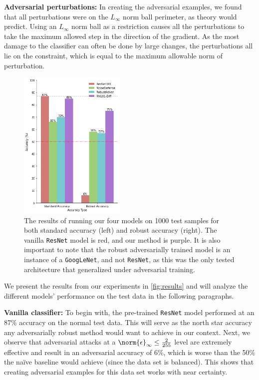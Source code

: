 \textbf{Adversarial perturbations:}
In creating the adversarial examples, we found that all perturbations were on the $L_\infty$ norm ball perimeter, as theory would predict. Using an $L_\infty$ norm ball as a restriction causes all the perturbations to take the maximum allowed step in the direction of the gradient. As the most damage to the classifier can often be done by large changes, the perturbations all lie on the constraint, which is equal to the maximum allowable norm of perturbation.



\begin{figure}
    \includegraphics[width=0.45\textwidth]{Figures/result_bar.png}
    \caption{The results of running our four models on 1000 test samples for both standard accuracy (left) and robust accuracy (right). The vanilla \texttt{ResNet} model is red, and our method is purple. It is also important to note that the robust adversarially trained model is an instance of a \texttt{GoogLeNet}, and not \texttt{ResNet}, as this was the only tested architecture that generalized under adversarial training.}
    \vspace*{-1mm}
    \label{fig:results}
\end{figure}


We present the results from our experiments in \autoref{fig:results} and will analyze the different models' performance on the test data in the following paragraphs.

\textbf{Vanilla classifier:}
To begin with, the pre-trained \texttt{ResNet} model performed at an 87\% accuracy on the normal test data. This will serve as the north star accuracy any adversarially robust method would want to achieve in our context. Next, we observe that adversarial attacks at a $\norm{\epsilon}_\infty\leq\frac{2}{255}$ level are extremely effective and result in an adversarial accuracy of 6\%, which is worse than the 50\% the naïve baseline would achieve (since the data set is balanced). This shows that creating adversarial examples for this data set works with near certainty.


